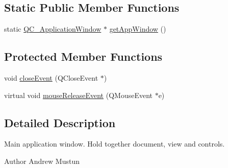 \subsection*{Static Public Member Functions}
\begin{DoxyCompactItemize}
\item 
static \hyperlink{classQC__ApplicationWindow}{Q\-C\-\_\-\-Application\-Window} $\ast$ \hyperlink{classQC__ApplicationWindow_ac1b6db3ba0942d8ff2ae8453857486bd}{get\-App\-Window} ()
\end{DoxyCompactItemize}
\subsection*{Protected Member Functions}
\begin{DoxyCompactItemize}
\item 
void \hyperlink{classQC__ApplicationWindow_a37c10c1b7396981bcef9c109cd73411b}{close\-Event} (Q\-Close\-Event $\ast$)
\item 
virtual void \hyperlink{classQC__ApplicationWindow_a8f87d6eabf93766b22f0897e8edfdf79}{mouse\-Release\-Event} (Q\-Mouse\-Event $\ast$e)
\end{DoxyCompactItemize}


\subsection{Detailed Description}
Main application window. Hold together document, view and controls.

\begin{DoxyAuthor}{Author}
Andrew Mustun 
\end{DoxyAuthor}


